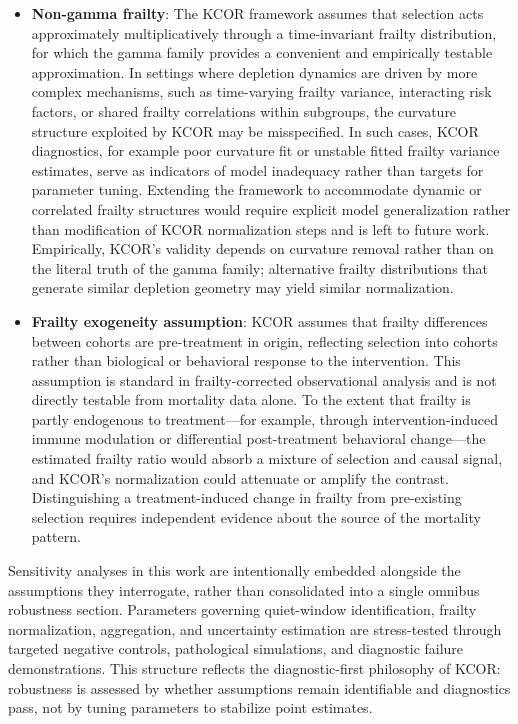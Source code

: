 \documentclass[
]{article}
\begin{document}
\begin{itemize}
\item
  \textbf{Non-gamma frailty}: The KCOR framework assumes that selection acts approximately multiplicatively through a time-invariant frailty distribution, for which the gamma family provides a convenient and empirically testable approximation. In settings where depletion dynamics are driven by more complex mechanisms, such as time-varying frailty variance, interacting risk factors, or shared frailty correlations within subgroups, the curvature structure exploited by KCOR may be misspecified. In such cases, KCOR diagnostics, for example poor curvature fit or unstable fitted frailty variance estimates, serve as indicators of model inadequacy rather than targets for parameter tuning. Extending the framework to accommodate dynamic or correlated frailty structures would require explicit model generalization rather than modification of KCOR normalization steps and is left to future work. Empirically, KCOR's validity depends on curvature removal rather than on the literal truth of the gamma family; alternative frailty distributions that generate similar depletion geometry may yield similar normalization.
\item
  \textbf{Frailty exogeneity assumption}: KCOR assumes that frailty differences between cohorts are pre-treatment in origin, reflecting selection into cohorts rather than biological or behavioral response to the intervention. This assumption is standard in frailty-corrected observational analysis and is not directly testable from mortality data alone. To the extent that frailty is partly endogenous to treatment---for example, through intervention-induced immune modulation or differential post-treatment behavioral change---the estimated frailty ratio would absorb a mixture of selection and causal signal, and KCOR's normalization could attenuate or amplify the contrast. Distinguishing a treatment-induced change in frailty from pre-existing selection requires independent evidence about the source of the mortality pattern.
\end{itemize}

Sensitivity analyses in this work are intentionally embedded alongside the assumptions they interrogate, rather than consolidated into a single omnibus robustness section. Parameters governing quiet-window identification, frailty normalization, aggregation, and uncertainty estimation are stress-tested through targeted negative controls, pathological simulations, and diagnostic failure demonstrations. This structure reflects the diagnostic-first philosophy of KCOR: robustness is assessed by whether assumptions remain identifiable and diagnostics pass, not by tuning parameters to stabilize point estimates.
\end{document}
